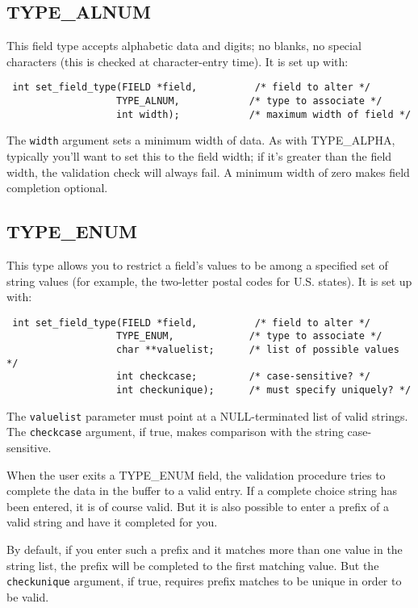\subsection{TYPE\_ALNUM}

\label{f0:ftype.alnum}This field type accepts alphabetic data and digits; no blanks, no special
characters (this is checked at character-entry time).  It is set up with:
\begin{verbatim} int set_field_type(FIELD *field,          /* field to alter */
                   TYPE_ALNUM,            /* type to associate */
                   int width);            /* maximum width of field */
\end{verbatim}
The \texttt{width} argument sets a minimum width of data.  As with
TYPE\_ALPHA, typically you'll want to set this to the field width; if it's
greater than the field width, the validation check will always fail.  A
minimum width of zero makes field completion optional.

\subsection{TYPE\_ENUM}

\label{f0:ftype.enum}This type allows you to restrict a field's values to be among a specified
set of string values (for example, the two-letter postal codes for U.S.
states).  It is set up with:
\begin{verbatim} int set_field_type(FIELD *field,          /* field to alter */
                   TYPE_ENUM,             /* type to associate */
                   char **valuelist;      /* list of possible values */
                   int checkcase;         /* case-sensitive? */
                   int checkunique);      /* must specify uniquely? */
\end{verbatim}
The \texttt{valuelist} parameter must point at a NULL-terminated list of
valid strings.  The \texttt{checkcase} argument, if true, makes comparison
with the string case-sensitive. 

When the user exits a TYPE\_ENUM field, the validation procedure tries to
complete the data in the buffer to a valid entry.  If a complete choice string
has been entered, it is of course valid.  But it is also possible to enter a
prefix of a valid string and have it completed for you. 

By default, if you enter such a prefix and it matches more than one value
in the string list, the prefix will be completed to the first matching
value.  But the \texttt{checkunique} argument, if true, requires prefix
matches to be unique in order to be valid. 

